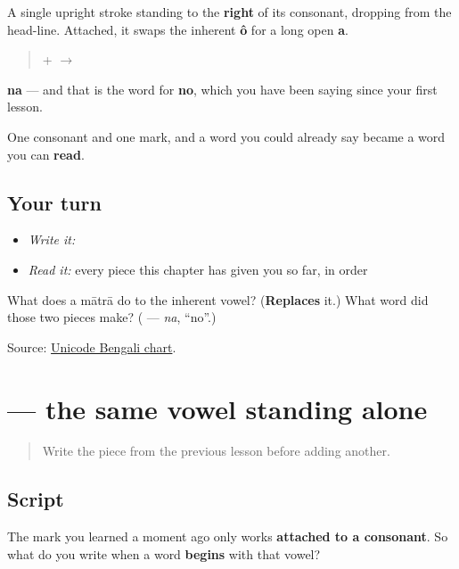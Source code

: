\begin{quote}
\end{quote}

A single upright stroke standing to the \textbf{right} of its consonant, dropping from the head-line. Attached, it swaps the inherent \textbf{ô} for a long open \textbf{a}.

\begin{quote}
\textbf{} + \textbf{} $\to$ \textbf{}
\end{quote}

\textbf{na} — and that is the word for \textbf{no}, which you have been saying since your first lesson.

One consonant and one mark, and a word you could already say became a word you can \textbf{read}.

\subsection*{Your turn}
\begin{itemize}
\raggedright
  \item \emph{Write it:} 
  \item \emph{Read it:} every piece this chapter has given you so far, in order
\end{itemize}

\begin{tcolorbox}[breakable,colback=teal!4,colframe=teal!35!black,title={Before you move on}]
What does a mātrā do to the inherent vowel? (\textbf{Replaces} it.) What word did those two pieces make? (\textbf{} — \emph{na}, \textquotedblleft{}no\textquotedblright{}.)

Source: \href{https://www.unicode.org/charts/PDF/U0980.pdf}{Unicode Bengali chart}.
\end{tcolorbox}
\section[\texorpdfstring{\bn{আ} (a)}{আ (a)}]{ — the same vowel standing alone}

\label{lesson:BN-W01-aa}



\begin{quote}
Write the piece from the previous lesson before adding another.
\end{quote}

\subsection*{Script}
The mark you learned a moment ago only works \textbf{attached to a consonant}. So what do you write when a word \textbf{begins} with that vowel?

